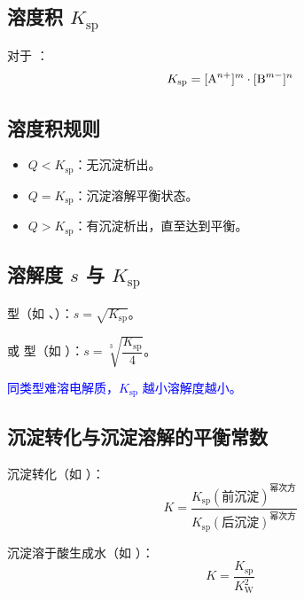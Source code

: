         \subsection{\texorpdfstring{溶度积 \(K_\text{sp}\)}{溶度积}}

            对于 ：\[
                K_\text{sp} = \cemh{[A^{n+}]}^m \cdot \cemh{[B^{m-}]}^n
            \]

        \subsection{溶度积规则}

            \begin{itemize}
                \item \(Q < K_\text{sp}\)：无沉淀析出。
                \item \(Q = K_\text{sp}\)：沉淀溶解平衡状态。
                \item \(Q > K_\text{sp}\)：有沉淀析出，直至达到平衡。
            \end{itemize}

        \subsection{\texorpdfstring{溶解度 \(s\) 与 \(K_\text{sp}\)}{溶解度与溶度积}}

            \begin{datas}
                \item {} 型（如 、）：\(s = \sqrt{K_\text{sp}}\)。
                \item {} 或  型（如 ）：\(s = \sqrt[3]{\dfrac{K_\text{sp}}{4}}\)。
            \end{datas}

            \textcolor{blue}{同类型难溶电解质，\(K_\text{sp}\) 越小溶解度越小。}

        \subsection{沉淀转化与沉淀溶解的平衡常数}

            沉淀转化（如 ）：\[
                K = \frac{K_\text{sp}(\text{前沉淀})^\text{幂次方}}{K_\text{sp}(\text{后沉淀})^\text{幂次方}}
            \]

            沉淀溶于酸生成水（如 ）：\[
                K = \frac{K_\text{sp}}{K_\text{W}^2}
            \]

